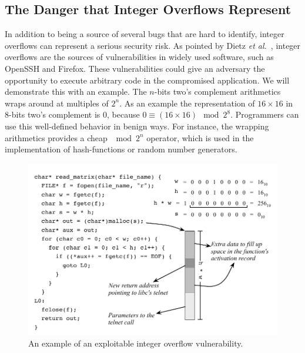 \documentclass[preprint]{sigplanconf}[10pt]
\begin{document}
\subsection{The Danger that Integer Overflows Represent}
\label{sub:danger}

In addition to being a source of several bugs that are hard to identify, integer 
overflows can represent a serious security risk.
As pointed by Dietz {\em et al.}~\cite{Dietz12}, integer overflows are the
sources of vulnerabilities in widely used software, such as OpenSSH and
Firefox.
These vulnerabilities could give an adversary the opportunity to execute
arbitrary code in the compromised application. 
We will demonstrate this with an example.
The $n$-bits two's complement arithmetics wraps around at multiples of
$2^n$.
As an example the representation of $16 \times 16$ in 8-bits two's complement
is $0$, because $0 \equiv (16\times16) \mod 2^8$.
Programmers can use this well-defined behavior in benign ways.
For instance, the wrapping arithmetics provides a cheap $\mod 2^n$ operator,
which is used in the implementation of hash-functions or random number
generators.

\begin{figure}[t!]
\begin{center}
\includegraphics[width=\columnwidth]{images/ex_buffer_overflow}
\end{center}
\caption{\label{fig:ex_buffer_overflow}
An example of an exploitable integer overflow vulnerability.}
\end{figure}
\end{document}
